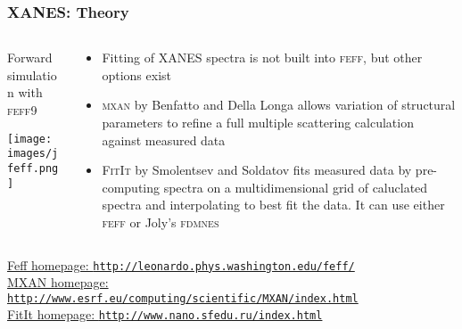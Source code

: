 \documentclass[10pt, xcolor=x11names, compress]{beamer}
\begin{document}
\begin{frame}
  \frametitle{XANES: Theory}
  \begin{columns}
    \begin{column}{0.5\linewidth}
      \begin{center}
        Forward simulation with \textsc{feff}9
      \end{center}
      \texttt{[image: images/jfeff.png]}
    \end{column}
    \begin{column}{0.5\linewidth}
      \begin{itemize}
      \item Fitting of XANES spectra is not built into \textsc{feff},
        but other options exist
      \item \textsc{mxan} by Benfatto and Della Longa allows variation
        of structural parameters to refine a full multiple scattering
        calculation against measured data
      \item \textsc{FitIt} by Smolentsev and Soldatov fits measured
        data by pre-computing spectra on a multidimensional grid of
        caluclated spectra and interpolating to best fit the data.  It
        can use either \textsc{feff} or Joly's \textsc{fdmnes}
      \end{itemize}

    \end{column}
  \end{columns}

  \begin{bottomnote}[0.7][19]
    \href{http://leonardo.phys.washington.edu/feff/}
    {\color{LightBlue4}{\ComputerMouse~}Feff homepage: \texttt{http://leonardo.phys.washington.edu/feff/}}%
    \\
    \href{http://www.esrf.eu/computing/scientific/MXAN/index.html}
    {\color{LightBlue4}{\ComputerMouse~}MXAN homepage: \texttt{http://www.esrf.eu/computing/scientific/MXAN/index.html}}%
    \\
    \href{http://www.nano.sfedu.ru/index.html} 
    {\color{LightBlue4}{\ComputerMouse~}FitIt homepage: \texttt{http://www.nano.sfedu.ru/index.html}}
  \end{bottomnote}
\end{frame}
\end{document}
